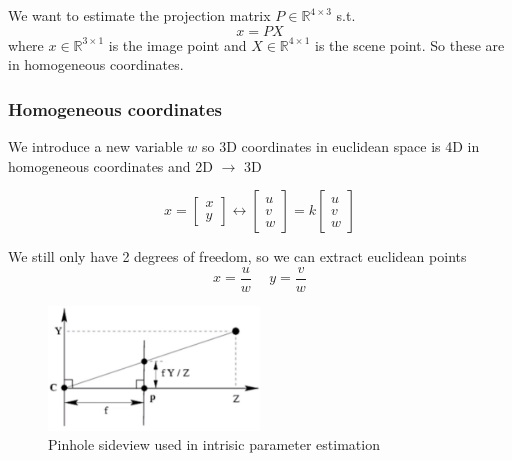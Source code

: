\documentclass[a4paper]{article}
\begin{document}
We want to estimate the projection matrix $ P \in \mathbb{R}^{4 \times 3}  $ s.t. 
\begin{equation}
x = PX
\end{equation}
where $ x \in \mathbb{R}^{3 \times 1}  $ is the image point and $ X \in \mathbb{R}^{4 \times 1} $ is the scene point. So these are in homogeneous coordinates.

\subsubsection*{Homogeneous coordinates}
We introduce a new variable $ w $ so 3D coordinates in euclidean space is 4D in homogeneous coordinates and 2D $ \rightarrow $ 3D

\begin{equation}
x = \begin{bmatrix}
x \\
y
\end{bmatrix} \leftrightarrow \begin{bmatrix}
u \\
v \\
w
\end{bmatrix} = k \begin{bmatrix}
u \\
v \\
w
\end{bmatrix} 
\end{equation}

We still only have 2 degrees of freedom, so we can extract euclidean points 
\begin{equation}
	x = \frac{u}{w} \hspace{15pt} y = \frac{v}{w} 
\end{equation}


\begin{figure}[H]
\centering
\includegraphics[width=0.5\textwidth]{figures/pinhole_sideview.png}
\caption{Pinhole sideview used in intrisic parameter estimation}
\label{fig:pinhole_sideview}
\end{figure} 
\end{document}
